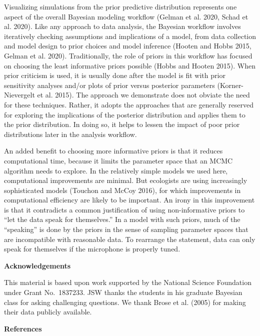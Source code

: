\documentclass[
  12pt,
]{article}
\begin{document}
Visualizing simulations from the prior predictive distribution
represents one aspect of the overall Bayesian modeling workflow (Gelman
et al. 2020, Schad et al. 2020). Like any approach to data analysis, the
Bayesian workflow involves iteratively checking assumptions and
implications of a model, from data collection and model design to prior
choices and model inference (Hooten and Hobbs 2015, Gelman et al. 2020).
Traditionally, the role of priors in this workflow has focused on
choosing the least informative priors possible (Hobbs and Hooten 2015).
When prior criticism is used, it is usually done after the model is fit
with prior sensitivity analyses and/or plots of prior versus posterior
parameters (Korner-Nievergelt et al. 2015). The approach we demonstrate
does not obviate the need for these techniques. Rather, it adopts the
approaches that are generally reserved for exploring the implications of
the posterior distribution and applies them to the prior distribution.
In doing so, it helps to lessen the impact of poor prior distributions
later in the analysis workflow.

An added benefit to choosing more informative priors is that it reduces
computational time, because it limits the parameter space that an MCMC
algorithm needs to explore. In the relatively simple models we used
here, computational improvements are minimal. But ecologists are using
increasingly sophisticated models (Touchon and McCoy 2016), for which
improvements in computational efficiency are likely to be important. An
irony in this improvement is that it contradicts a common justification
of using non-informative priors to ``let the data speak for
themselves.'' In a model with such priors, much of the ``speaking'' is
done by the priors in the sense of sampling parameter spaces that are
incompatible with reasonable data. To rearrange the statement, data can
only speak for themselves if the microphone is properly tuned.

\textbf{Acknowledgements}

This material is based upon work supported by the National Science
Foundation under Grant No.~1837233. JSW thanks the students in his
graduate Bayesian class for asking challenging questions. We thank Brose
et al. (2005) for making their data publicly available.

\textbf{References}
\end{document}
